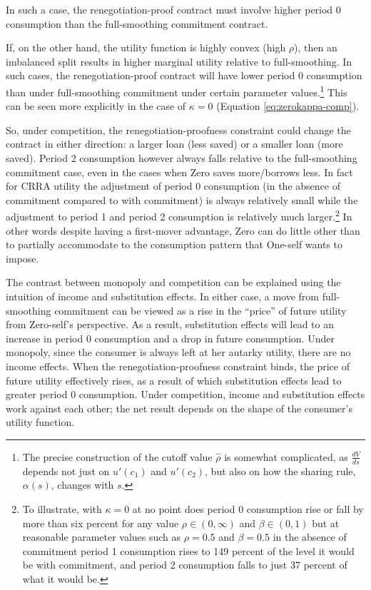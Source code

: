 \documentclass[11pt,english]{article}
\theoremstyle{plain}
\theoremstyle{definition}
\begin{document}
In such a case, the renegotiation-proof contract must involve higher
period 0 consumption than the full-smoothing commitment contract.

If, on the other hand, the utility function is highly convex (high
$\rho$), then an imbalanced split results in higher marginal utility
relative to full-smoothing. In such cases, the renegotiation-proof
contract will have lower period 0 consumption than under full-smoothing
commitment under certain parameter values.\footnote{The precise construction of the cutoff value $\hat{\rho}$ is somewhat
complicated, as $\frac{dV}{ds}$ depends not just on $u'\left(c_{1}\right)$
and $u'\left(c_{2}\right)$, but also on how the sharing rule, $\alpha\left(s\right)$,
changes with $s$.} This can be seen more explicitly in the case of $\kappa=0$ (Equation
\ref{eq:zerokappa-comp}).

So, under competition, the renegotiation-proofness constraint could
change the contract in either direction: a larger loan (less saved)
or a smaller loan (more saved). Period 2 consumption however always
falls relative to the full-smoothing commitment case, even in the
cases when Zero saves more/borrows less. In fact for CRRA utility
the adjustment of period 0 consumption (in the absence of commitment
compared to with commitment) is always relatively small while the
adjustment to period 1 and period 2 consumption is relatively much
larger.\footnote{To illustrate, with $\kappa=0$ at no point does period 0 consumption
rise or fall by more than six percent for any value $\rho\in(0,\infty)$
and $\beta\in(0,1)$ but at reasonable parameter values such as $\rho=0.5$
and $\beta=0.5$ in the absence of commitment period 1 consumption
rises to 149 percent of the level it would be with commitment, and
period 2 consumption falls to just 37 percent of what it would be.} In other words despite having a first-mover advantage, Zero can do
little other than to partially accommodate to the consumption pattern
that One-self wants to impose.

The contrast between monopoly and competition can be explained using
the intuition of income and substitution effects. In either case,
a move from full-smoothing commitment can
be viewed as a rise in the ``price'' of future utility from Zero-self's
perspective. As a result, substitution effects will lead to an increase
in period 0 consumption and a drop in future consumption. Under monopoly,
since the consumer is always left at her autarky utility, there are
no income effects. When the renegotiation-proofness constraint binds,
the price of future utility effectively rises, as a result of which
substitution effects lead to greater period 0 consumption. Under competition,
income and substitution effects work against each other; the net result
depends on the shape of the consumer's utility function.
\end{document}
